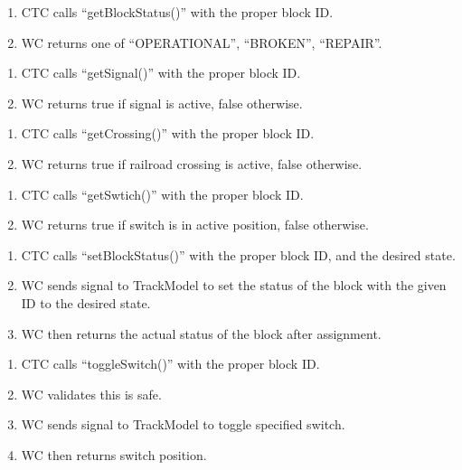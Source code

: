 \documentclass{scrreprt}
\begin{document}
    \begin{enumerate}
        \item CTC calls ``getBlockStatus()'' with the proper block ID.
        \item WC returns one of ``OPERATIONAL'', ``BROKEN'', ``REPAIR''.
    \end{enumerate}

    \begin{enumerate}
        \item CTC calls ``getSignal()'' with the proper block ID.
        \item WC returns true if signal is active, false otherwise.
    \end{enumerate}

    \begin{enumerate}
        \item CTC calls ``getCrossing()'' with the proper block ID.
        \item WC returns true if railroad crossing is active, false otherwise.
    \end{enumerate}

    \begin{enumerate}
        \item CTC calls ``getSwtich()'' with the proper block ID.
        \item WC returns true if switch is in active position, false otherwise.
    \end{enumerate}

    \begin{enumerate}
        \item CTC calls ``setBlockStatus()'' with the proper block ID, and the desired state.
        \item WC sends signal to TrackModel to set the status of the block with the given ID to the desired state.
        \item WC then returns the actual status of the block after assignment.
    \end{enumerate}

    \begin{enumerate}
        \item CTC calls ``toggleSwitch()'' with the proper block ID.
        \item WC validates this is safe.
        \item WC sends signal to TrackModel to toggle specified switch.
        \item WC then returns switch position.
    \end{enumerate}
\end{document}
